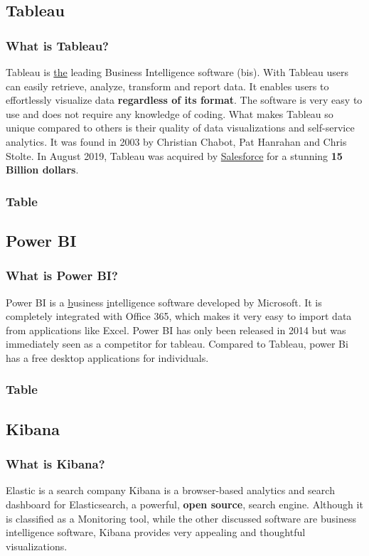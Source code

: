         \subsection{Tableau}
        \subsubsection{What is Tableau?}
        Tableau is \underline{the} leading Business Intelligence software (\gls{bis}). With Tableau users can easily retrieve, analyze, transform and report data. It enables users to effortlessly visualize data \textbf{regardless of its format}. The software is very easy to use and does not require any knowledge of coding. What makes Tableau so unique compared to others is their quality of data visualizations and self-service analytics. It was found in 2003 by Christian Chabot, Pat Hanrahan and Chris Stolte. In August 2019, Tableau was acquired by \href{https://www.salesforce.com/}{Salesforce} for a stunning \textbf{15 Billion dollars}.
       \subsubsection{Table} 
         
       
        \subsection{Power BI}
        \subsubsection{What is Power BI?}
        Power BI is a \underline{b}usiness \underline{i}ntelligence software developed by Microsoft. It is completely integrated with Office 365, which makes it very easy to import data from applications like Excel. Power BI has only been released in 2014 but was immediately seen as a competitor for tableau. Compared to Tableau, power Bi has a free desktop applications for individuals.
        
        \subsubsection{Table}
        
        \subsection{Kibana}
        \subsubsection{What is Kibana?} 
        Elastic is a search company 
        Kibana is a browser-based analytics and search dashboard for Elasticsearch, a powerful, \textbf{open source}, search engine. Although it is classified as a Monitoring tool, while the other discussed software are business intelligence software, Kibana provides very appealing and thoughtful visualizations.
